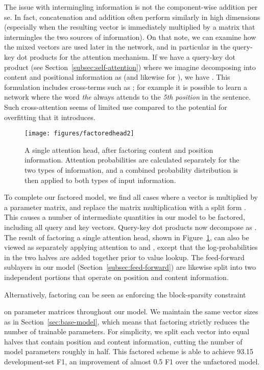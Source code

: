 \documentclass[11pt,a4paper]{article}
\begin{document}
\newcommand{\content}[1]{{#1}^{(c)}}
\newcommand{\position}[1]{{#1}^{(p)}}
The issue with intermingling information is not the component-wise addition per se. In fact, concatenation and addition often perform similarly in high dimensions (especially when the resulting vector is immediately multiplied by a matrix that intermingles the two sources of information). On that note, we can examine how the mixed vectors are used later in the network, and in particular in the query-key dot products for the attention mechanism. If we have a query-key dot product  (see Section~\ref{subsec:self-attention}) where we imagine  decomposing into content and positional information as  (and likewise for ), we have . This formulation includes cross-terms such as ; for example it is possible to learn a network where the word \emph{the} always attends to the \emph{5th position} in the sentence. Such cross-attention seems of limited use compared to the potential for overfitting that it introduces.

\begin{figure}
  \centering
    \texttt{[image: figures/factoredhead2]}
    \caption{A single attention head, after factoring content and position information. Attention probabilities are calculated separately for the two types of information, and a combined probability distribution is then applied to both types of input information.}
    \label{fig:factored-head}
\end{figure}

To complete our factored model, we find all cases where a vector  is multiplied by a parameter matrix, and replace the matrix multiplication  with a split form . This causes a number of intermediate quantities in our model to be factored, including all query and key vectors. Query-key dot products now decompose as . The result of factoring a single attention head, shown in Figure~\ref{fig:factored-head}, can also be viewed as separately applying attention to  and , except that the log-probabilities in the two halves are added together prior to value lookup.
The feed-forward sublayers in our model (Section~\ref{subsec:feed-forward}) are likewise split into two independent portions that operate on position and content information.

Alternatively, factoring can be seen as enforcing the block-sparsity constraint

on parameter matrices throughout our model. We maintain the same vector sizes as in Section~\ref{sec:base-model}, which means that factoring strictly reduces the number of trainable parameters. For simplicity, we split each vector into equal halves that contain position and content information, cutting the number of model parameters roughly in half.
This factored scheme is able to achieve 93.15 development-set F1, an improvement of almost 0.5 F1 over the unfactored model.
\end{document}
